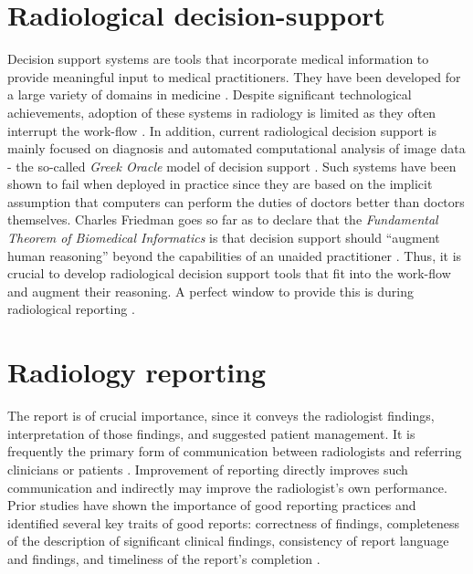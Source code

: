 \section{Radiological decision-support}
Decision support systems are tools that incorporate medical information to provide meaningful input to medical practitioners. They have been developed for a large variety of domains in medicine \cite{Bright:2012ga,Garg:2005cb,Miller:1994cx,Kawamoto:2005gn}. Despite significant technological achievements, adoption of these systems in radiology is limited as they often interrupt the  work-flow \cite{Morgan:2011ct}. In addition, current radiological decision support is mainly focused on diagnosis and automated computational analysis of image data \cite{Garg:2005cb, Burnside:2000wl, ElizabethS:2005gc, Rubin:2005jg} - the so-called \emph{Greek Oracle} model of decision support \cite{Miller:1990wg,Miller:1994cx}. Such systems have been shown to fail when deployed in practice since they are based on the implicit assumption that computers can perform the duties of doctors better than doctors themselves. Charles Friedman goes so far as to declare that the \emph{Fundamental Theorem of Biomedical Informatics} is that decision support should ``augment human reasoning'' beyond the capabilities of an unaided practitioner \cite{Friedman:2009dx}. Thus, it is crucial to develop radiological decision support tools that fit into the work-flow and augment their reasoning. A perfect window to provide this is during radiological reporting \cite{Noumeir:2006cb}.

\section{Radiology reporting}
The report is of crucial importance, since it conveys the radiologist findings, interpretation of those findings, and suggested patient management. It is frequently the primary form of communication between radiologists and referring clinicians or patients \cite{Sistrom:2005cx}. Improvement of reporting directly improves such communication and indirectly may improve the radiologist's own performance. Prior studies have shown the importance of good reporting practices and identified several key traits of good reports: correctness of findings, completeness of the description of significant clinical findings, consistency of report language and findings, and timeliness of the report's completion \cite{Johnson:2004kh, HaraldO:2004hi}.

